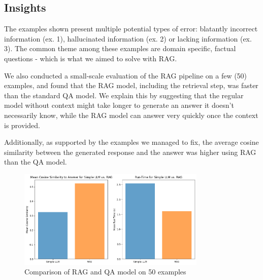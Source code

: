 \documentclass[12pt]{article}
\begin{document}
\subsection{Insights}


The examples shown present multiple potential types of error: blatantly incorrect information (ex. 1), hallucinated information (ex. 2) or lacking information (ex. 3).
The common theme among these examples are domain specific, factual questions - which is what we aimed to solve with RAG.

We also conducted a small-scale evaluation of the RAG pipeline on a few (50) examples, and found that the RAG model, including the retrieval step, was faster than the standard QA model. 
We explain this by suggesting that the regular model without context might take longer to generate an answer it doesn't necessarily know, while the RAG model can answer very quickly once the context is provided.

Additionally, as supported by the examples we managed to fix, the average cosine similarity between the generated response and the answer was higher using RAG than the QA model.

\begin{figure}[H]
    \centering
    \includegraphics[width=0.8\textwidth]{images/3_1.png}
    \caption{Comparison of RAG and QA model on 50 examples}
\end{figure}

\end{document}

